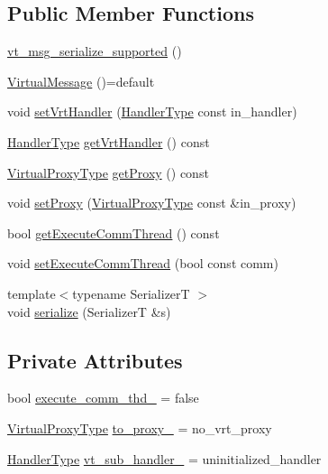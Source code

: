 \subsection*{Public Member Functions}
\begin{DoxyCompactItemize}
\item 
\hyperlink{structvt_1_1vrt_1_1_virtual_message_a4d91471760fc7b86e84a91f54596b1bd}{vt\+\_\+msg\+\_\+serialize\+\_\+supported} ()
\item 
\hyperlink{structvt_1_1vrt_1_1_virtual_message_a28ae0fd29c23d4e9552e659ff7f66cd5}{Virtual\+Message} ()=default
\item 
void \hyperlink{structvt_1_1vrt_1_1_virtual_message_ab5f98b003a74ff59c4c423da5cd715bc}{set\+Vrt\+Handler} (\hyperlink{namespacevt_af64846b57dfcaf104da3ef6967917573}{Handler\+Type} const in\+\_\+handler)
\item 
\hyperlink{namespacevt_af64846b57dfcaf104da3ef6967917573}{Handler\+Type} \hyperlink{structvt_1_1vrt_1_1_virtual_message_aaa41fe4b317b868fdcceb7c119feec9c}{get\+Vrt\+Handler} () const
\item 
\hyperlink{namespacevt_a1b417dd5d684f045bb58a0ede70045ac}{Virtual\+Proxy\+Type} \hyperlink{structvt_1_1vrt_1_1_virtual_message_a37cbc50547e033f049af3c9d289036cc}{get\+Proxy} () const
\item 
void \hyperlink{structvt_1_1vrt_1_1_virtual_message_aa4b2b70c7d560be3adff74102803ff51}{set\+Proxy} (\hyperlink{namespacevt_a1b417dd5d684f045bb58a0ede70045ac}{Virtual\+Proxy\+Type} const \&in\+\_\+proxy)
\item 
bool \hyperlink{structvt_1_1vrt_1_1_virtual_message_a9511339ccb737b655708c9071965dc76}{get\+Execute\+Comm\+Thread} () const
\item 
void \hyperlink{structvt_1_1vrt_1_1_virtual_message_a8149137c049179f315d295b5127b61ad}{set\+Execute\+Comm\+Thread} (bool const comm)
\item 
{\footnotesize template$<$typename SerializerT $>$ }\\void \hyperlink{structvt_1_1vrt_1_1_virtual_message_a08c925ee68dfb197b5e1dc9ca961b0d7}{serialize} (SerializerT \&s)
\end{DoxyCompactItemize}
\subsection*{Private Attributes}
\begin{DoxyCompactItemize}
\item 
bool \hyperlink{structvt_1_1vrt_1_1_virtual_message_aed6af00314e6e8e26f6e5ae4d8498f57}{execute\+\_\+comm\+\_\+thd\+\_\+} = false
\item 
\hyperlink{namespacevt_a1b417dd5d684f045bb58a0ede70045ac}{Virtual\+Proxy\+Type} \hyperlink{structvt_1_1vrt_1_1_virtual_message_a4a5e7604c7191fc8d94dac4a973aad8c}{to\+\_\+proxy\+\_\+} = no\+\_\+vrt\+\_\+proxy
\item 
\hyperlink{namespacevt_af64846b57dfcaf104da3ef6967917573}{Handler\+Type} \hyperlink{structvt_1_1vrt_1_1_virtual_message_a9fe6bc641b3cd85c47faaf2cc6883d2a}{vt\+\_\+sub\+\_\+handler\+\_\+} = uninitialized\+\_\+handler
\end{DoxyCompactItemize}


